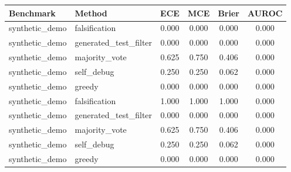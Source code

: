 \begin{tabular}{llcccc}
\toprule
Benchmark & Method & ECE & MCE & Brier & AUROC \\
\midrule
synthetic_demo & falsification & 0.000 & 0.000 & 0.000 & 0.000 \\
synthetic_demo & generated_test_filter & 0.000 & 0.000 & 0.000 & 0.000 \\
synthetic_demo & majority_vote & 0.625 & 0.750 & 0.406 & 0.000 \\
synthetic_demo & self_debug & 0.250 & 0.250 & 0.062 & 0.000 \\
synthetic_demo & greedy & 0.000 & 0.000 & 0.000 & 0.000 \\
synthetic_demo & falsification & 1.000 & 1.000 & 1.000 & 0.000 \\
synthetic_demo & generated_test_filter & 0.000 & 0.000 & 0.000 & 0.000 \\
synthetic_demo & majority_vote & 0.625 & 0.750 & 0.406 & 0.000 \\
synthetic_demo & self_debug & 0.250 & 0.250 & 0.062 & 0.000 \\
synthetic_demo & greedy & 0.000 & 0.000 & 0.000 & 0.000 \\
\bottomrule
\end{tabular}
